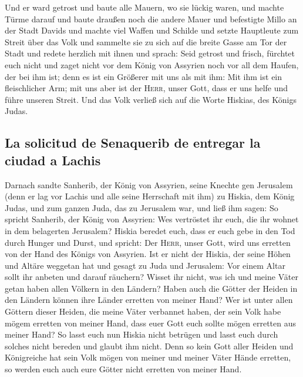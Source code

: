 Und er ward getrost und baute alle Mauern, wo sie lückig
waren, und machte Türme darauf und baute draußen noch die andere Mauer
und befestigte Millo an der Stadt Davids und machte viel Waffen und
Schilde  und setzte Hauptleute zum Streit über das Volk
und sammelte sie zu sich auf die breite Gasse am Tor der Stadt und
redete herzlich mit ihnen und sprach:  Seid getrost und
frisch, fürchtet euch nicht und zaget nicht vor dem König von Assyrien
noch vor all dem Haufen, der bei ihm ist; denn es ist ein Größerer mit
uns als mit ihm:  Mit ihm ist ein fleischlicher Arm; mit
uns aber ist der \textsc{Herr}, unser Gott, dass er uns helfe und führe
unseren Streit. Und das Volk verließ sich auf die Worte Hiskias, des
Königs Judas.

\hypertarget{la-solicitud-de-senaquerib-de-entregar-la-ciudad-a-lachis}{%
\subsection{La solicitud de Senaquerib de entregar la ciudad a
Lachis}\label{la-solicitud-de-senaquerib-de-entregar-la-ciudad-a-lachis}}

 Darnach sandte Sanherib, der König von Assyrien, seine
Knechte gen Jerusalem (denn er lag vor Lachis und alle seine Herrschaft
mit ihm) zu Hiskia, dem König Judas, und zum ganzen Juda, das zu
Jerusalem war, und ließ ihm sagen:  So spricht Sanherib,
der König von Assyrien: Wes vertröstet ihr euch, die ihr wohnet in dem
belagerten Jerusalem?  Hiskia beredet euch, dass er euch
gebe in den Tod durch Hunger und Durst, und spricht: Der \textsc{Herr},
unser Gott, wird uns erretten von der Hand des Königs von Assyrien.
 Ist er nicht der Hiskia, der seine Höhen und Altäre
weggetan hat und gesagt zu Juda und Jerusalem: Vor einem Altar sollt ihr
anbeten und darauf räuchern?  Wisset ihr nicht, was ich
und meine Väter getan haben allen Völkern in den Ländern? Haben auch die
Götter der Heiden in den Ländern können ihre Länder erretten von meiner
Hand?  Wer ist unter allen Göttern dieser Heiden, die
meine Väter verbannet haben, der sein Volk habe mögem erretten von
meiner Hand, dass euer Gott euch sollte mögen erretten aus meiner Hand?
 So lasst euch nun Hiskia nicht betrügen und lasst euch
durch solches nicht bereden und glaubt ihm nicht. Denn so kein Gott
aller Heiden und Königreiche hat sein Volk mögen von meiner und meiner
Väter Hände erretten, so werden euch auch eure Götter nicht erretten von
meiner Hand.

